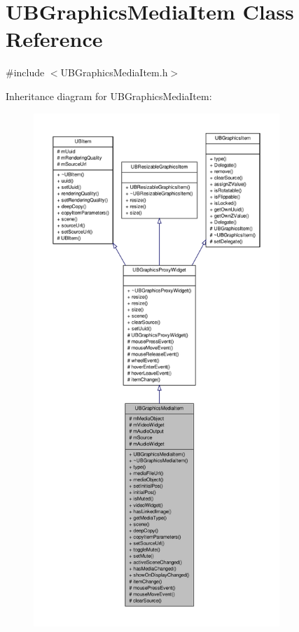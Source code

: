 \hypertarget{class_u_b_graphics_media_item}{\section{U\-B\-Graphics\-Media\-Item Class Reference}
\label{dc/d5a/class_u_b_graphics_media_item}
}


{\ttfamily \#include $<$U\-B\-Graphics\-Media\-Item.\-h$>$}



Inheritance diagram for U\-B\-Graphics\-Media\-Item\-:
\nopagebreak
\begin{figure}[H]
\begin{center}
\leavevmode
\includegraphics[height=550pt]{d9/dde/class_u_b_graphics_media_item__inherit__graph}
\end{center}
\end{figure}


